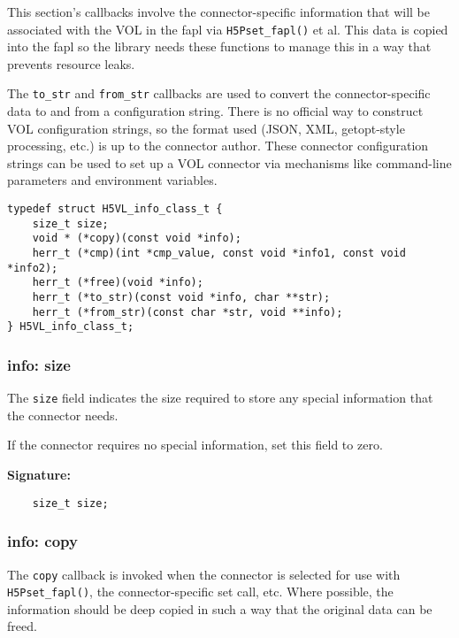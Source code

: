 This section's callbacks involve the connector-specific information that will be associated with the VOL in the fapl via \texttt{H5Pset\_fapl()} et al. This data is copied into the fapl so the library needs these functions to manage this in a way that prevents resource leaks.

The \texttt{to\_str} and \texttt{from\_str} callbacks are used to convert the connector-specific data to and from a configuration string. There is no official way to construct VOL configuration strings, so the format used (JSON, XML, getopt-style processing, etc.) is up to the connector author. These connector configuration strings can be used to set up a VOL connector via mechanisms like command-line parameters and environment variables.

\begin{lstlisting}[caption={Info class for connector information routines, H5VLconnector.h}, captionpos=b, label={lst:Infoclass}]
typedef struct H5VL_info_class_t {                                               
    size_t size;
    void * (*copy)(const void *info);
    herr_t (*cmp)(int *cmp_value, const void *info1, const void *info2);
    herr_t (*free)(void *info);
    herr_t (*to_str)(const void *info, char **str);
    herr_t (*from_str)(const char *str, void **info);
} H5VL_info_class_t;
\end{lstlisting}

\subsubsection{info: size}
The \texttt{size} field indicates the size required to store any special information that the connector needs.

If the connector requires no special information, set this field to zero.

\begin{mdframed}[style=bgbox]
\textbf{Signature:}
\begin{lstlisting}
    size_t size;
\end{lstlisting}
\end{mdframed}

\subsubsection{info: copy}
The \texttt{copy} callback is invoked when the connector is selected for use with \texttt{H5Pset\_fapl()}, the connector-specific set call, etc. Where possible, the information should be deep copied in such a way that the original data can be freed.

